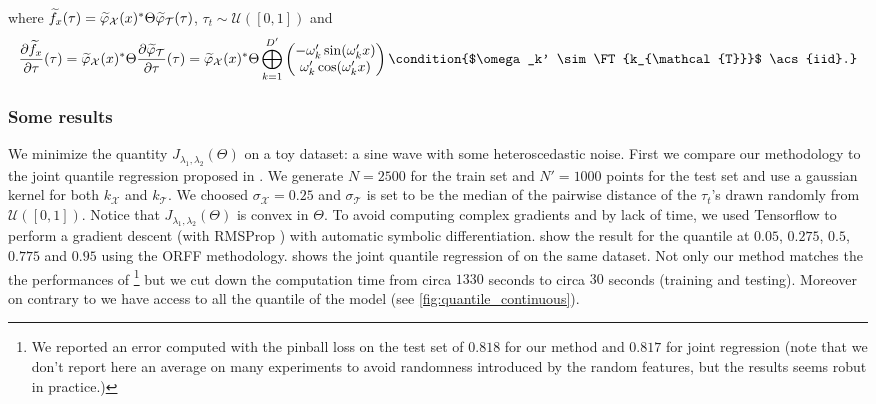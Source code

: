 where $\widetilde{f}_{x}(\tau)=\widetilde{\varphi}_{\mathcal{X}}(x)^*
\Theta \widetilde{\varphi}_{\mathcal{T}}(\tau)$, $\tau_t \sim \mathcal{U}([0,
1])$ and
\begin{dmath*}
    \frac{\partial \widetilde{f}_{x}}{\partial\tau}(\tau)
    = \tildephi{\omega}_{\mathcal{X}}(x)^\adjoint \Theta \frac{\partial
    \tildephi{\omega}_{\mathcal{T}}}{\partial \tau}(\tau)
    = \tildephi{\omega}_{\mathcal{X}}(x)^\adjoint \Theta \Vect_{k=1}^{D'}
    \begin{pmatrix}
        -\omega_k' \sin(\omega_k' x) \\
         \omega_k' \cos(\omega_k' x)
    \end{pmatrix} \condition{$\omega_k' \sim \FT{k_{\mathcal{T}}}$ \acs{iid}.}
\end{dmath*}
\subsubsection{Some results}
We minimize the quantity $J_{\lambda_1, \lambda_2}(\Theta)$ on a toy dataset: a
sine wave with some heteroscedastic noise. First we compare our methodology to
the joint quantile regression proposed in \citet{sangnier2016joint}. We
generate $N=2500$ for the train set and $N'=1000$ points for the test set and
use a gaussian kernel for both $k_{\mathcal{X}}$ and $k_{\mathcal{T}}$. We
choosed $\sigma_{\mathcal{X}} = 0.25$ and $\sigma_{\mathcal{T}}$ is set to be
the median of the pairwise distance of the $\tau_t$'s drawn randomly from
$\mathcal{U}([0, 1])$. Notice that $J_{\lambda_1, \lambda_2}(\Theta)$ is convex
in $\Theta$. To avoid computing complex gradients and by lack of time, we used
Tensorflow \citep{abadi2016tensorflow} to perform a gradient descent (with
RMSProp \citep{tieleman2012lecture}) with automatic symbolic differentiation.
 show the result for the quantile at $0.05$, $0.275$,
$0.5$, $0.775$ and $0.95$ using the \acs{ORFF} methodology. 
 shows the joint quantile regression of
\citet{sangnier2016joint} on the same dataset. Not only our method matches the
the performances of \citet{sangnier2016joint}\footnote{We reported an error
computed with the pinball loss on the test set of $0.818$ for our method and
$0.817$ for joint regression (note that we don't report here an average on many
experiments to avoid randomness introduced by the random features, but the
results seems robut in practice.)} but we cut down the computation time from
circa $1330$ seconds to circa $30$ seconds (training and testing).  Moreover on
contrary to \citet{sangnier2016joint} we have access to all the quantile of the
model (see \cref{fig:quantile_continuous}).

